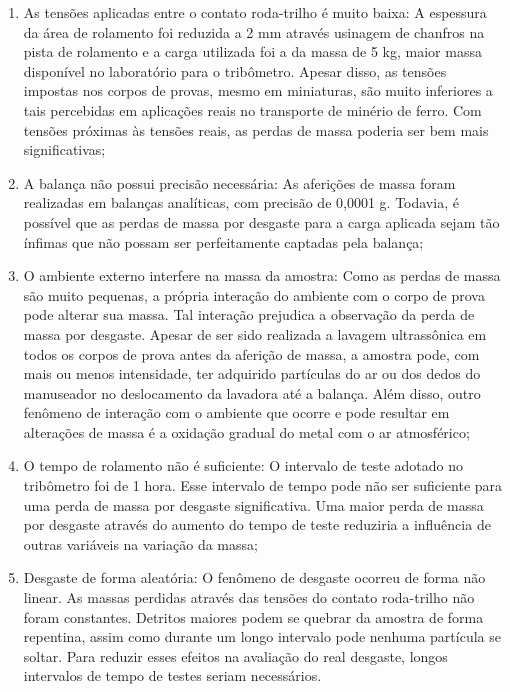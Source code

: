 \documentclass[
12pt,
openany, %
oneside, %
a4paper,			
english,			
brazil			        %
]{abntbibufjf}
\begin{document}
		\begin{enumerate}[label=\roman*]
			\item As tensões aplicadas entre o contato roda-trilho é muito baixa: A espessura da área de rolamento foi reduzida a 2 mm através usinagem de chanfros na pista de rolamento e a carga utilizada foi a da massa de 5 kg, maior massa disponível no laboratório para o tribômetro. Apesar disso, as tensões impostas nos corpos de provas, mesmo em miniaturas, são muito inferiores a tais percebidas em aplicações reais no transporte de minério de ferro. Com tensões próximas às tensões reais, as perdas de massa poderia ser bem mais significativas;
			
			\item A balança não possui precisão necessária: As aferições de massa foram realizadas em balanças analíticas, com precisão de 0,0001 g. Todavia, é possível que as perdas de massa por desgaste para a carga aplicada sejam tão ínfimas que não possam ser perfeitamente captadas pela balança;
			
			\item O ambiente externo interfere na massa da amostra: Como as perdas de massa são muito pequenas, a própria interação do ambiente com o corpo de prova pode alterar sua massa. Tal interação prejudica a observação da perda de massa por desgaste. Apesar de ser sido realizada a lavagem ultrassônica em todos os corpos de prova antes da aferição de massa, a amostra pode, com mais ou menos intensidade, ter adquirido partículas do ar ou dos dedos do manuseador no deslocamento da lavadora até a balança. Além disso, outro fenômeno de interação com o ambiente que ocorre e pode resultar em alterações de massa é a oxidação gradual do metal com o ar atmosférico;
			
			\item O tempo de rolamento não é suficiente: O intervalo de teste adotado no tribômetro foi de 1 hora. Esse intervalo de tempo pode não ser suficiente para uma perda de massa por desgaste significativa. Uma maior perda de massa por desgaste através do aumento do tempo de teste reduziria a influência de outras variáveis na variação da massa;
			
			\item Desgaste de forma aleatória: O fenômeno de desgaste ocorreu de forma não linear. As massas perdidas através das tensões do contato roda-trilho não foram constantes. Detritos maiores podem se quebrar da amostra de forma repentina, assim como durante um longo intervalo pode nenhuma partícula se soltar. Para reduzir esses efeitos na avaliação do real desgaste, longos intervalos de tempo de testes seriam necessários.
			
		\end{enumerate}
	
\end{document}
